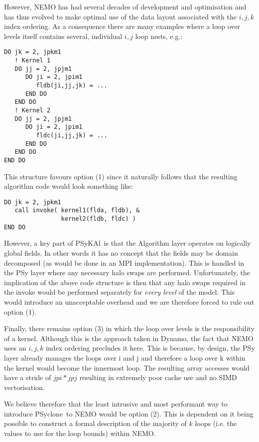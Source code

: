 \documentclass{article}
\newcommand{\psykal}{{PS}y{KA}l}
\newcommand{\psyclone}{{PS}yclone}
\begin{document}
However, NEMO has had several decades of development and optimisation
and has thus evolved to make optimal use of the data layout associated
with the $i,j,k$ index ordering. As a consequence there are many
examples where a loop over levels itself contains several, individual
$i,j$ loop nests, e.g.:

\begin{verbatim}
DO jk = 2, jpkm1
   ! Kernel 1
   DO jj = 2, jpjm1
      DO ji = 2, jpim1
         fldb(ji,jj,jk) = ...
      END DO
   END DO
   ! Kernel 2
   DO jj = 2, jpjm1
      DO ji = 2, jpim1
         fldc(ji,jj,jk) = ...
      END DO
   END DO
END DO
\end{verbatim}

This structure favours option (1) since it naturally follows that the
resulting algorithm code would look something like:

\begin{verbatim}
DO jk = 2, jpkm1
   call invoke( kernel1(flda, fldb), &
                kernel2(fldb, fldc) )
END DO
\end{verbatim}

However, a key part of \psykal\ is that the Algorithm layer operates on
logically global fields. In other words it has no concept that the
fields may be domain decomposed (as would be done in an MPI
implementation). This is handled in the PSy layer where any necessary
halo swaps are performed. Unfortunately, the implication of the above
code structure is then that any halo swaps required in the invoke
would be performed separately for \emph{every level} of the
model. This would introduce an unacceptable overhead and we are
therefore forced to rule out option (1).

Finally, there remains option (3) in which the loop over levels is the
responsibility of a kernel. Although this is the approach taken in
Dynamo, the fact that NEMO uses an $i,j,k$ index ordering precludes it
here. This is because, by design, the PSy layer already manages the
loops over i and j and therefore a loop over k within the kernel would
become the innermost loop. The resulting array accesses would have a
stride of $jpi*jpj$ resulting in extremely poor cache use and no SIMD
vectorisation.

We believe therefore that the least intrusive and most performant way
to introduce \psyclone\ to NEMO would be option (2). This is dependent
on it being possible to construct a formal description of the majority
of $k$ loops (i.e. the values to use for the loop bounds) within NEMO.
\end{document}
